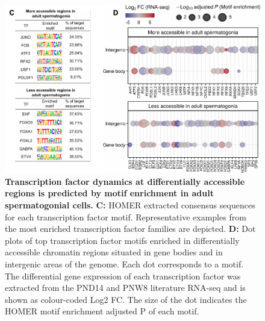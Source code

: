 \documentclass[12pt,twoside]{reedthesis}
\begin{document}
\begin{subfigures}
\begin{figure}[H]
{\centering \includegraphics{thesis_files/figure-latex/df4b-1} 

}

\caption[Transcription factor dynamics at differentially accessible regions is predicted by motif enrichment in adult spermatogonial cells]{\textbf{Transcription factor dynamics at differentially accessible regions is predicted by motif enrichment in adult spermatogonial cells.} \newline \textbf{C:} HOMER extracted consensus sequences for each transcription factor motif. Representative examples from the most enriched transcription factor families are depicted. \newline \textbf{D:} Dot plots of top transcription factor motifs enriched in differentially accessible chromatin regions situated in gene bodies and in intergenic areas of the genome. Each dot corresponds to a motif. The differential gene expression of each transcription factor was extracted from the PND14 and PNW8 literature RNA-seq and is shown as colour-coded Log2 FC. The size of the dot indicates the HOMER motif enrichment adjusted P of each motif.}\label{fig:df4b}
\end{figure}
\end{subfigures}
\end{document}
